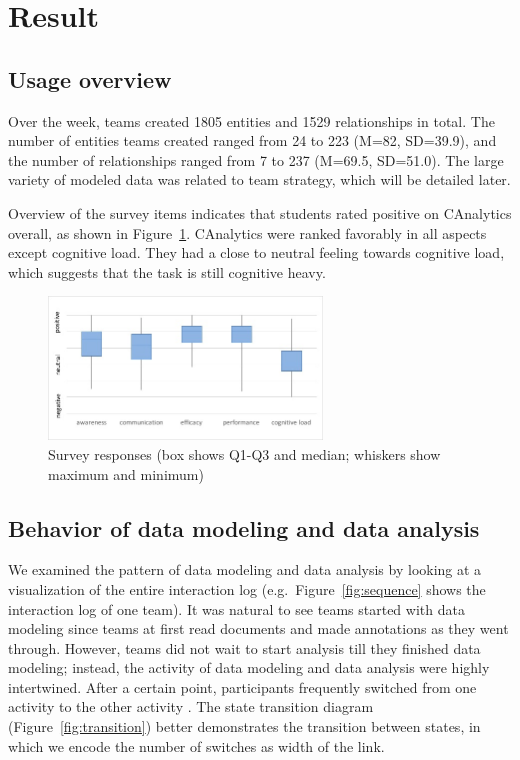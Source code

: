 \section{Result}\label{result}

\subsection{Usage overview}\label{usage-overview}

Over the week, teams created 1805 entities and 1529 relationships in
total. The number of entities teams created ranged from 24 to 223 (M=82,
SD=39.9), and the number of relationships ranged from 7 to 237 (M=69.5,
SD=51.0). The large variety of modeled data was related to team
strategy, which will be detailed later.

Overview of the survey items indicates that students rated positive on
CAnalytics overall, as shown in Figure~\ref{fig:survey}. CAnalytics
were ranked favorably in all aspects except cognitive load. They had a
close to neutral feeling towards cognitive load, which suggests that the
task is still cognitive heavy.

\begin{figure}
\centering
\includegraphics[height=1.5in]{./img/survey_boxchart.jpg}
\caption{Survey responses (box shows Q1-Q3 and median; whiskers show
maximum and minimum)}\label{fig:survey}
\end{figure}

\subsection{Behavior of data modeling and data
analysis}\label{behavior-of-data-modeling-and-data-analysis}

We examined the pattern of data modeling and data analysis by looking at
a visualization of the entire interaction log (e.g.~Figure~\ref{fig:sequence} shows the interaction log of one team). It was natural to see teams
started with data modeling since teams at first read documents and made annotations as they went through. However, teams did not wait to start analysis till they
finished data modeling; instead, the activity of data modeling and data
analysis were highly intertwined. After a certain point, participants frequently 
switched from one activity to the other activity . The state
transition diagram (Figure~\ref{fig:transition}) better demonstrates the
transition between states, in which we encode the number of switches as
width of the link.


